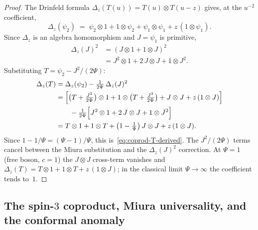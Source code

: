 \begin{proof}
The Drinfeld formula
$\Delta_z(T(u)) = T(u) \otimes T(u-z)$
gives, at the $u^{-2}$ coefficient,
\[
 \Delta_z(\psi_2)
 \;=\;
 \psi_2 \otimes 1
 + 1 \otimes \psi_2
 + \psi_1 \otimes \psi_1
 + z\,(1 \otimes \psi_1).
\]
Since $\Delta_z$ is an algebra homomorphism and
$J = \psi_1$ is primitive,
\begin{align*}
 \Delta_z(J)^2
 &= (J \otimes 1 + 1 \otimes J)^2 \\
 &= J^2 \otimes 1
 + 2\,J \otimes J
 + 1 \otimes J^2.
\end{align*}
Substituting $T = \psi_2 - J^2/(2\Psi)$:
\begin{align*}
 \Delta_z(T)
 &= \Delta_z(\psi_2)
 - \tfrac{1}{2\Psi}\,\Delta_z(J)^2 \\
 &= \Bigl[
 \bigl(T + \tfrac{J^2}{2\Psi}\bigr) \otimes 1
 + 1 \otimes \bigl(T + \tfrac{J^2}{2\Psi}\bigr)
 + J \otimes J
 + z\,(1 \otimes J)
 \Bigr] \\
 &\qquad
 - \tfrac{1}{2\Psi}\Bigl[
 J^2 \otimes 1
 + 2\,J \otimes J
 + 1 \otimes J^2
 \Bigr] \\
 &= T \otimes 1
 + 1 \otimes T
 + \bigl(1 - \tfrac{1}{\Psi}\bigr)\,
 J \otimes J
 + z\,(1 \otimes J).
\end{align*}
Since $1 - 1/\Psi = (\Psi - 1)/\Psi$, this
is~\eqref{eq:coprod-T-derived}. The
$J^2/(2\Psi)$ terms cancel between the Miura
substitution and the $\Delta_z(J)^2$ correction.
At $\Psi = 1$ (free boson, $c = 1$) the
$J \otimes J$ cross-term vanishes and
$\Delta_z(T) = T \otimes 1 + 1 \otimes T
+ z\,(1 \otimes J)$;
in the classical limit $\Psi \to \infty$ the
coefficient tends to~$1$.
\end{proof}


\subsection{The spin-$3$ coproduct, Miura universality,
and the conformal anomaly}
\label{subsec:spin3-miura-anomaly}


